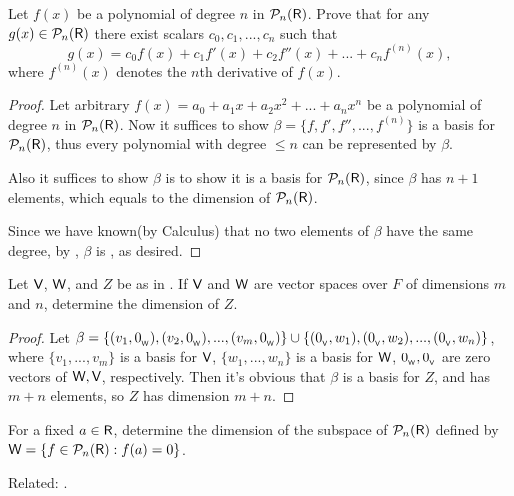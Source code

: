 \begin{exercise} \label{exercise 1.6.24}
Let \(f(x)\) be a polynomial of degree \(n\) in \(\mathcal{P}_n(\textsf{R})\).
Prove that for any \(g(x) \in \mathcal{P}_n(\textsf{R})\) there exist scalars \(c_0, c_1, ..., c_n\) such that
\[
    g(x) = c_0 f(x) + c_1 f'(x) + c_2 f''(x) + ... + c_n f^{(n)}(x),
\]
where \(f^{(n)}(x)\) denotes the \(n\)th derivative of \(f(x)\).
\end{exercise}

\begin{proof}
Let arbitrary \(f(x) = a_0 + a_1 x + a_2 x^2 + ... + a_n x^n\) be a polynomial of degree \(n\) in \(\mathcal{P}_n(\textsf{R})\).
Now it suffices to show \(\beta = \{ f, f', f'', ..., f^{(n)} \}\) is a basis for \(\mathcal{P}_n(\textsf{R})\), thus every polynomial with degree \(\le n\) can be represented by \(\beta\).

Also it suffices to show \(\beta\) is \LID{} to show it is a basis for \(\mathcal{P}_n(\textsf{R})\), since \(\beta\) has \(n + 1\) elements, which equals to the dimension of \(\mathcal{P}_n(\textsf{R})\).

Since we have known(by Calculus) that no two elements of \(\beta\) have the same degree, by , \(\beta\) is \LID{}, as desired.
\end{proof}

\begin{exercise} \label{exercise 1.6.25}
Let \(\textsf{V}\), \(\textsf{W}\), and \(Z\) be as in .
If \(\textsf{V}\) and \(\textsf{W}\) are vector spaces over \(F\) of dimensions \(m\) and \(n\), determine the dimension of \(Z\).
\end{exercise}

\begin{proof}
\sloppy Let \(\beta = \{ (v_1, 0_{_{\textsf{W}}}), (v_2, 0_{_{\textsf{W}}}), ..., (v_m, 0_{_{\textsf{W}}}) \} \cup \{ (0_{_{\textsf{V}}}, w_1), (0_{_{\textsf{V}}}, w_2), ..., (0_{_{\textsf{V}}}, w_n) \}\),
where \(\{ v_1, ..., v_m \}\) is a basis for \(\textsf{V}\), \(\{ w_1, ..., w_n \}\) is a basis for \(\textsf{W}\), \(0_{_{\textsf{W}}}, 0_{_{\textsf{V}}}\) are zero vectors of \(\textsf{W}, \textsf{V}\), respectively.
Then it's obvious that \(\beta\) is a basis for \(Z\), and has \(m + n\) elements, so \(Z\) has dimension \(m + n\).
\end{proof}

\begin{exercise} \label{exercise 1.6.26}
For a fixed \(a \in \textsf{R}\), determine the dimension of the subspace of \(\mathcal{P}_n(\textsf{R})\) defined by \(\textsf{W} = \{ f \in \mathcal{P}_n(\textsf{R}) : f(a) = 0 \}\).

Related: .
\end{exercise}

